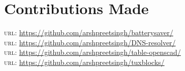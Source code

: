 \documentclass[10pt, a4paper]{article}
\begin{document}
\section*{Contributions Made}
\textsc{url}: \href{https://github.com/arshpreetsingh/batterysaver/}{https://github.com/arshpreetsingh/batterysaver/}\\
\textsc{url}: \href{https://github.com/arshpreetsingh/DNS-resolver/}{https://github.com/arshpreetsingh/DNS-resolver/}\\
\textsc{url}: \href{https://github.com/arshpreetsingh/table-openscad/}{https://github.com/arshpreetsingh/table-openscad/}\\
\textsc{url}: \href{https://github.com/arshpreetsingh/tuxblocks/}{https://github.com/arshpreetsingh/tuxblocks/}\\


{\XeTeX }\\
\end{document}
